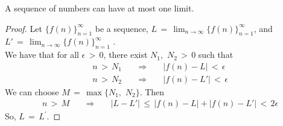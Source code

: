 \begin{theorem}
A sequence of numbers can have at most one limit.
\begin{proof}
    Let $\{f(n)\}_{n=1}^{\infty}$ be a sequence, $L \hspace{2pt} = \hspace{2pt}  \lim_{n \longrightarrow \infty} \{f(n)\}_{n=1}^{\infty}$, and $L' \hspace{2pt} = \hspace{2pt} \lim_{n \longrightarrow \infty} \{f(n)\}_{n=1}^{\infty}$ .\\
    We have that for all $\epsilon \hspace{2pt} > \hspace{2pt} 0$, there exist $N_{1}, \hspace{4pt} N_{2} \hspace{2pt} > \hspace{2pt} 0$ such that
    \begin{align*}
        &n \hspace{2pt} > \hspace{2pt} N_{1} \hspace{20pt} \Longrightarrow \hspace{20pt} \lvert f(n) - L \rvert \hspace{2pt} < \hspace{2pt} \epsilon \\[2ex]
        &n \hspace{2pt} > \hspace{2pt} N_{2} \hspace{20pt} \Longrightarrow \hspace{20pt} \lvert f(n) - L' \rvert \hspace{2pt} < \hspace{2pt} \epsilon
    \end{align*}
    We can choose $M \hspace{2pt} = \hspace{2pt} \max\{N_1, \hspace{4pt} N_{2}\}$. Then
    \begin{align*}
        &n \hspace{2pt} >\hspace{2pt} M \hspace{20pt} \Longrightarrow \hspace{20pt} \lvert L - L' \rvert \hspace{2pt} \leq \hspace{2pt} \lvert f(n) - L \rvert + \lvert f(n) - L' \rvert \hspace{2pt} < \hspace{2pt} 2\epsilon
    \end{align*}
    So, $L \hspace{2pt} = \hspace{2pt} L^{'}$.
\end{proof}
\label{limit_uniqueness}
\end{theorem}

